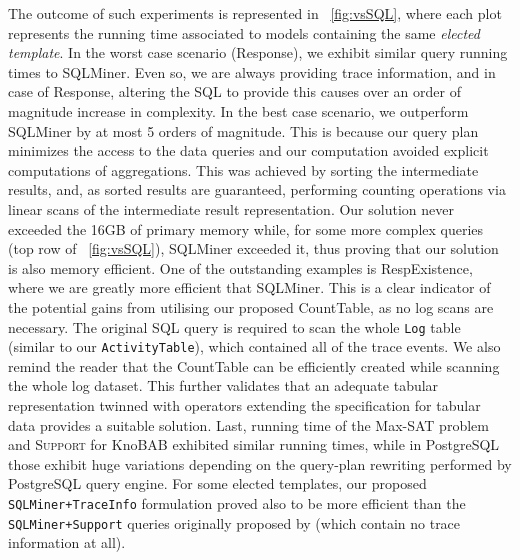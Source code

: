 The outcome of such experiments is represented in \figurename~\ref{fig:vsSQL}, where each plot represents the running time associated to models containing the same \textit{elected template}. In the worst case scenario (\textsf{Response}), we exhibit similar query running times to SQLMiner. Even so, we are always providing trace information, and in case of \textsf{Response}, altering the SQL to provide this causes over an order of magnitude increase in complexity. In the best case scenario, we outperform SQLMiner by at most 5 orders of magnitude. This is because our query plan minimizes the access to the data queries and our computation avoided explicit computations of aggregations. This was achieved by sorting the intermediate results, and, as sorted results are guaranteed, performing counting operations via linear scans of the intermediate result representation. Our solution never exceeded the 16GB of primary memory while, for some more complex queries (top row of \figurename~\ref{fig:vsSQL}), SQLMiner exceeded it, thus proving that our solution is also memory efficient. One of the outstanding examples is \textsf{RespExistence}, where we are greatly more efficient that SQLMiner. This is a clear indicator of the potential gains from utilising our proposed \textsf{CountTable}, as no log scans are necessary. The original SQL query is required to scan the whole \texttt{Log} table (similar to our \texttt{ActivityTable}), which contained all of the trace events. We also remind the reader that the \textsf{CountTable} can be efficiently created while scanning the whole log dataset. This further validates that an adequate tabular representation twinned with \xLTLf operators extending the \LTLf specification for tabular data provides a suitable solution. Last, running time of the Max-SAT problem and \textsc{Support} for KnoBAB exhibited similar running times, while in PostgreSQL those exhibit huge variations depending on the query-plan rewriting performed by PostgreSQL query engine. For some elected templates, our proposed \texttt{SQLMiner+TraceInfo} formulation proved also to be more efficient than the \texttt{SQLMiner+Support} queries originally proposed by \cite{Schonig15} (which contain no trace information at all).





